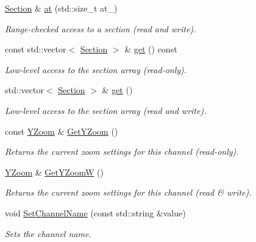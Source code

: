 \begin{DoxyCompactItemize}
\hyperlink{classSection}{Section} \& \hyperlink{classChannel_a4e0a0e63c39b5a593ce970e141a0a3d3}{at} (std::size\_\-t at\_\-)
\begin{DoxyCompactList}\small\item\em Range-\/checked access to a section (read and write). \item\end{DoxyCompactList}\item 
const std::vector$<$ \hyperlink{classSection}{Section} $>$ \& \hyperlink{classChannel_ae22f828ce5bea9ca4ccb7787072e0585}{get} () const 
\begin{DoxyCompactList}\small\item\em Low-\/level access to the section array (read-\/only). \item\end{DoxyCompactList}\item 
std::vector$<$ \hyperlink{classSection}{Section} $>$ \& \hyperlink{classChannel_a246087dd85eaa37347437b6d2d0e51a8}{get} ()
\begin{DoxyCompactList}\small\item\em Low-\/level access to the section array (read and write). \item\end{DoxyCompactList}\item 
const \hyperlink{classYZoom}{YZoom} \& \hyperlink{classChannel_a99998581e71361e5a06f79e7fbb0303e}{GetYZoom} ()
\begin{DoxyCompactList}\small\item\em Returns the current zoom settings for this channel (read-\/only). \item\end{DoxyCompactList}\item 
\hyperlink{classYZoom}{YZoom} \& \hyperlink{classChannel_a3995ccf99ce0031c7d2510d5444b8999}{GetYZoomW} ()
\begin{DoxyCompactList}\small\item\em Returns the current zoom settings for this channel (read \& write). \item\end{DoxyCompactList}\item 
void \hyperlink{classChannel_ac1816100ed2bf3b68f36872138c8d721}{SetChannelName} (const std::string \&value)
\begin{DoxyCompactList}\small\item\em Sets the channel name. \item\end{DoxyCompactList}\item 

\end{DoxyCompactItemize}
